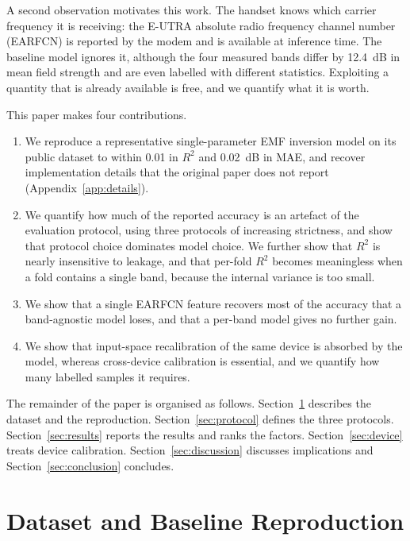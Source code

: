 \documentclass{ieeeaccess}
\begin{document}
A second observation motivates this work. The handset knows which carrier
frequency it is receiving: the E-UTRA absolute radio frequency channel number
(EARFCN) is reported by the modem and is available at inference time. The baseline
model ignores it, although the four measured bands differ by 12.4~dB in mean field
strength and are even labelled with different statistics. Exploiting a quantity
that is already available is free, and we quantify what it is worth.

This paper makes four contributions.
\begin{enumerate}
\item We reproduce a representative single-parameter EMF inversion model on its
public dataset to within 0.01 in $R^2$ and 0.02~dB in MAE, and recover
implementation details that the original paper does not report
(Appendix~\ref{app:details}).
\item We quantify how much of the reported accuracy is an artefact of the
evaluation protocol, using three protocols of increasing strictness, and show that
protocol choice dominates model choice. We further show that $R^2$ is nearly
insensitive to leakage, and that per-fold $R^2$ becomes meaningless when a fold contains a single band, because the internal variance is too small.
\item We show that a single EARFCN feature recovers most of the accuracy that a
band-agnostic model loses, and that a per-band model gives no further gain.
\item We show that input-space recalibration of the same device is absorbed by the
model, whereas cross-device calibration is essential, and we quantify how many
labelled samples it requires.
\end{enumerate}

The remainder of the paper is organised as follows. Section~\ref{sec:data}
describes the dataset and the reproduction. Section~\ref{sec:protocol} defines the
three protocols. Section~\ref{sec:results} reports the results and ranks the
factors. Section~\ref{sec:device} treats device calibration.
Section~\ref{sec:discussion} discusses implications and
Section~\ref{sec:conclusion} concludes.

\section{Dataset and Baseline Reproduction}
\label{sec:data}
\end{document}
